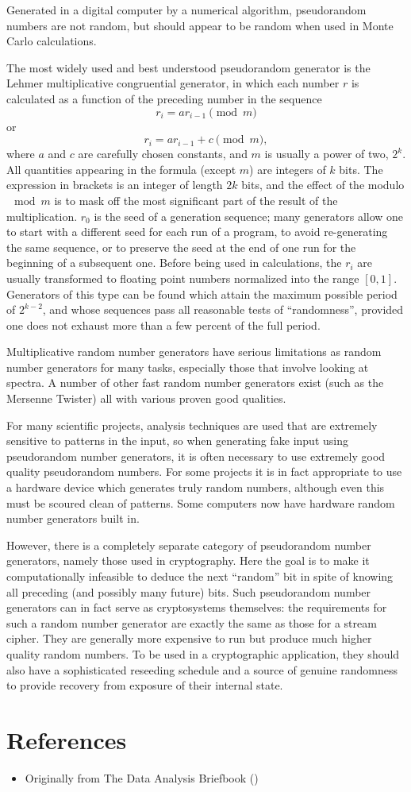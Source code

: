 \documentclass{article}
\begin{document}
Generated in a digital computer by a numerical algorithm, pseudorandom numbers are not random, but should appear to be random when used in Monte Carlo calculations.

The most widely used and best understood pseudorandom generator is the Lehmer multiplicative congruential generator, in which each number $r$ is calculated as a function of the preceding number in the sequence
\[
r_i = a r_{i-1}  \pmod{m}
\]
or
\[
r_i = a r_{i-1} + c  \pmod{m},
\]
where $a$ and $c$ are carefully chosen constants, and $m$ is usually a power of two, $2^k$. All quantities appearing in the formula (except $m$) are integers of $k$ bits. The expression in brackets is an integer of length $2k$ bits, and the effect of the modulo $\mod m$ is to mask off the most significant part of the result of the multiplication. $r_0$ is the seed of a generation sequence; many generators allow one to start with a different seed for each run of a program, to avoid re-generating the same sequence, or to preserve the seed at the end of one run for the beginning of a subsequent one. Before being used in calculations, the $r_i$ are usually transformed to floating point numbers normalized into the range $[0,1]$. Generators of this type can be found which attain the maximum possible period of $2^{k-2}$, and whose sequences pass all reasonable tests of ``randomness'', provided one does not exhaust more than a few percent of the full period.

Multiplicative random number generators have serious limitations as random number generators for many tasks, especially those that involve looking at spectra.  A number of other fast random number generators exist (such as the Mersenne Twister) all with various proven good qualities.

For many scientific projects, analysis techniques are used that are extremely sensitive to patterns in the input, so when generating fake input using pseudorandom number generators, it is often necessary to use extremely good quality pseudorandom numbers.  For some projects it is in fact appropriate to use a hardware device which generates truly random numbers, although even this must be scoured clean of patterns.  Some computers now have hardware random number generators built in.

However, there is a completely separate category of pseudorandom number generators, namely those used in cryptography.  Here the goal is to make it computationally infeasible to deduce the next ``random'' bit in spite of knowing all preceding (and possibly many future) bits.  Such pseudorandom number generators can in fact serve as cryptosystems themselves: the requirements for such a random number generator are exactly the same as those for a stream cipher.  They are generally more expensive to run but produce much higher quality random numbers.  To be used in a cryptographic application, they should also have a sophisticated reseeding schedule and a source of genuine randomness to provide recovery from exposure of their internal state.

\section*{References}

\begin{itemize}
\item Originally from The Data Analysis Briefbook
()
\end{itemize}
\end{document}
